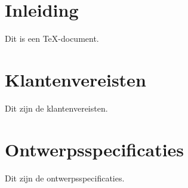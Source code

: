 \documentclass{article}
\begin{document}
\section{Inleiding}

Dit is een TeX-document.

\section{Klantenvereisten}

Dit zijn de klantenvereisten.

\section{Ontwerpsspecificaties}

Dit zijn de ontwerpsspecificaties.
\end{document}
